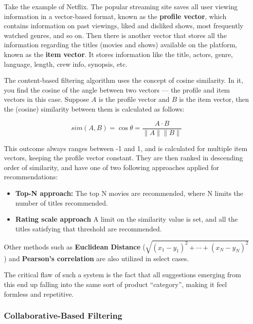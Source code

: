 \documentclass{article}
\begin{document}
\medskip

Take the example of Netflix. The popular streaming site saves all user viewing information in a vector-based format, known as the \textbf{profile vector}, which contains information on past viewings, liked and disliked shows, most frequently watched genres, and so on. Then there is another vector that stores all the information regarding the titles (movies and shows) available on the platform, known as the \textbf{item vector}. It stores information like the title, actors, genre, language, length, crew info, synopsis, etc.

\medskip

The content-based filtering algorithm uses the concept of cosine similarity. In it, you find the cosine of the angle between two vectors — the profile and item vectors in this case. Suppose \( A \) is the profile vector and \( B \) is the item vector, then the (cosine) similarity between them is calculated as follows:

$$ sim(A, B) = \cos{\theta} = \frac{A \cdot B}{\|A\| \|B\|} $$

This outcome always ranges between -1 and 1, and is calculated for multiple item vectors, keeping the profile vector constant. They are then ranked in descending order of similarity, and have one of two following approaches applied for recommendations:

\begin{itemize}
    \item{\textbf{Top-N approach:} The top N movies are recommended, where N limits the number of titles recommended.}
    \item{\textbf{Rating scale approach} A limit on the similarity value is set, and all the titles satisfying that threshold are recommended.}
\end{itemize}

Other methods such as \textbf{Euclidean Distance} ($ \sqrt{(x_1 - y_1) ^ 2 + \cdots + (x_N - y_N) ^ 2} $) and \textbf{Pearson’s correlation} are also utilized in select cases.

\medskip

The critical flaw of such a system is the fact that all suggestions emerging from this end up falling into the same sort of product ``category'', making it feel formless and repetitive.

\subsubsection{Collaborative-Based Filtering}
\end{document}
